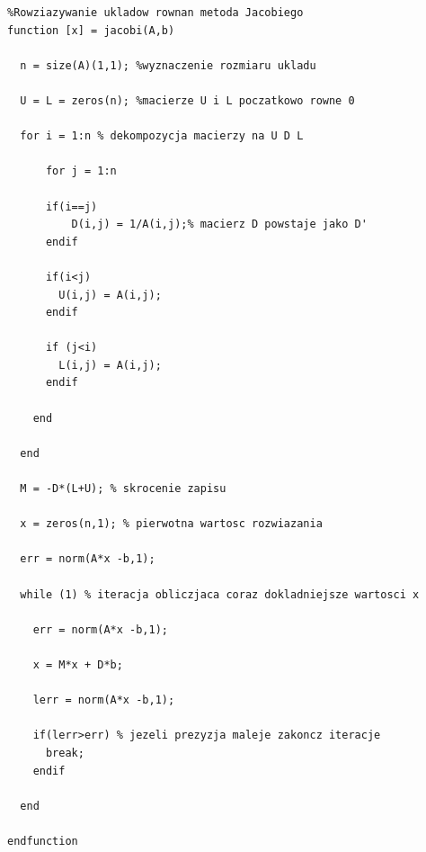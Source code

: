 \documentclass[a4paper, 11pt]{article}
\begin{document}
\begin{lstlisting}
%Rowziazywanie ukladow rownan metoda Jacobiego
function [x] = jacobi(A,b)
 
  n = size(A)(1,1); %wyznaczenie rozmiaru ukladu
   
  U = L = zeros(n); %macierze U i L poczatkowo rowne 0
  
  for i = 1:n % dekompozycja macierzy na U D L
    
      for j = 1:n
      
      if(i==j)
          D(i,j) = 1/A(i,j);% macierz D powstaje jako D'    
      endif
      
      if(i<j)
        U(i,j) = A(i,j);
      endif
      
      if (j<i)
        L(i,j) = A(i,j);
      endif
    
    end
  
  end
  
  M = -D*(L+U); % skrocenie zapisu
  
  x = zeros(n,1); % pierwotna wartosc rozwiazania
  
  err = norm(A*x -b,1); 
  
  while (1) % iteracja obliczjaca coraz dokladniejsze wartosci x
  
    err = norm(A*x -b,1);
  
    x = M*x + D*b;
   
    lerr = norm(A*x -b,1);
    
    if(lerr>err) % jezeli prezyzja maleje zakoncz iteracje
      break;
    endif
   
  end
  
endfunction

\end{lstlisting}
\end{document}
